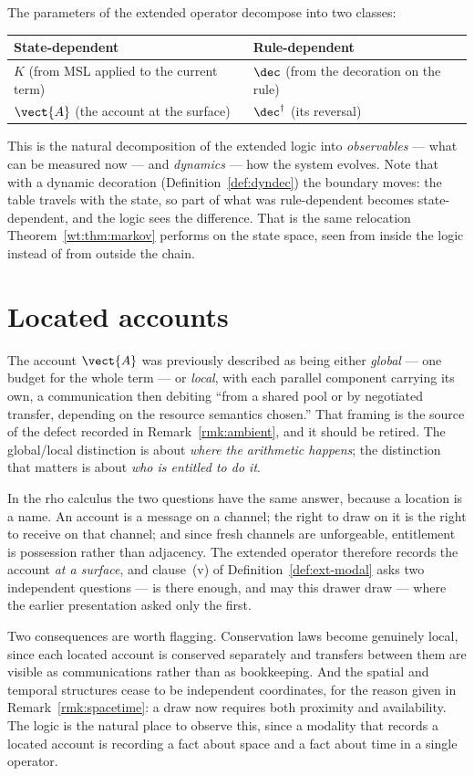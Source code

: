The parameters of the extended operator decompose into two classes:

\begin{center}
\begin{tabular}{ll}
\toprule
\textbf{State-dependent} & \textbf{Rule-dependent} \\
\midrule
$K$ (from MSL applied to the current term) & $\dec$ (from the decoration on the rule) \\
$\vect{A}$ (the account at the surface) & $\dec^{\dagger}$ (its reversal) \\
\bottomrule
\end{tabular}
\end{center}

This is the natural decomposition of the extended logic into
\emph{observables} --- what can be measured now --- and \emph{dynamics} ---
how the system evolves.  Note that with a dynamic decoration
(Definition~\ref{def:dyndec}) the boundary moves: the table travels with
the state, so part of what was rule-dependent becomes state-dependent, and
the logic sees the difference.  That is the same relocation
Theorem~\ref{wt:thm:markov} performs on the state space, seen from inside
the logic instead of from outside the chain.

\section{Located accounts}

The account $\vect{A}$ was previously described as being either
\emph{global} --- one budget for the whole term --- or \emph{local}, with
each parallel component carrying its own, a communication then debiting
``from a shared pool or by negotiated transfer, depending on the resource
semantics chosen.''  That framing is the source of the defect recorded in
Remark~\ref{rmk:ambient}, and it should be retired.  The global/local
distinction is about \emph{where the arithmetic happens}; the distinction
that matters is about \emph{who is entitled to do it}.

In the rho calculus the two questions have the same answer, because a
location is a name.  An account is a message on a channel; the right to
draw on it is the right to receive on that channel; and since fresh
channels are unforgeable, entitlement is possession rather than adjacency.
The extended operator therefore records the account \emph{at a surface},
and clause~(v) of Definition~\ref{def:ext-modal} asks two independent
questions --- is there enough, and may this drawer draw --- where the
earlier presentation asked only the first.

Two consequences are worth flagging.  Conservation laws become genuinely
local, since each located account is conserved separately and transfers
between them are visible as communications rather than as bookkeeping.
And the spatial and temporal structures cease to be independent
coordinates, for the reason given in Remark~\ref{rmk:spacetime}: a draw
now requires both proximity and availability.  The logic is the natural
place to observe this, since a modality that records a located account is
recording a fact about space and a fact about time in a single operator.

